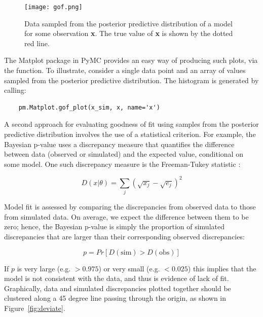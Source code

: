 \begin{figure}[h]
        \begin{center}
        \texttt{[image: gof.png]}
    \end{center}
    \caption{Data sampled from the posterior predictive distribution of a model for some observation \textbf{x}. The true value of \textbf{x} is shown by the dotted red line.}
    \label{fig:gof}
\end{figure}

The Matplot package in PyMC provides an easy way of producing such plots, via the  function. To illustrate, consider a single data point  and an array of values  sampled from the posterior predictive distribution. The histogram is generated by calling:

\begin{verbatim}
	pm.Matplot.gof_plot(x_sim, x, name='x')
\end{verbatim}

A second approach for evaluating goodness of fit using samples from the posterior predictive distribution involves the use of a statistical criterion. For example, the Bayesian p-value \citep{Gelman:1996gp} uses a discrepancy measure that quantifies the difference between data (observed or simulated) and the expected value, conditional on some model. One such discrepancy measure is the Freeman-Tukey statistic \citep{Brooks:2000il}:

\begin{equation}
	D(x|\theta) = \sum_j (\sqrt{x_j}-\sqrt{e_j})^2 
\end{equation}

Model fit is assessed by comparing the discrepancies from observed data to those from simulated data. On average, we expect the difference between them to be zero; hence, the Bayesian p-value is simply the proportion of simulated discrepancies that are larger than their corresponding observed discrepancies:

\begin{equation}
	p = Pr[ D(\text{sim}) > D(\text{obs}) ]
\end{equation}

If $p$ is very large (e.g. $>0.975$) or very small (e.g. $<0.025$) this implies that the model is not consistent with the data, and thus is evidence of lack of fit. Graphically, data and simulated discrepancies plotted together should be clustered along a 45 degree line passing through the origin, as shown in Figure~\ref{fig:deviate}.


